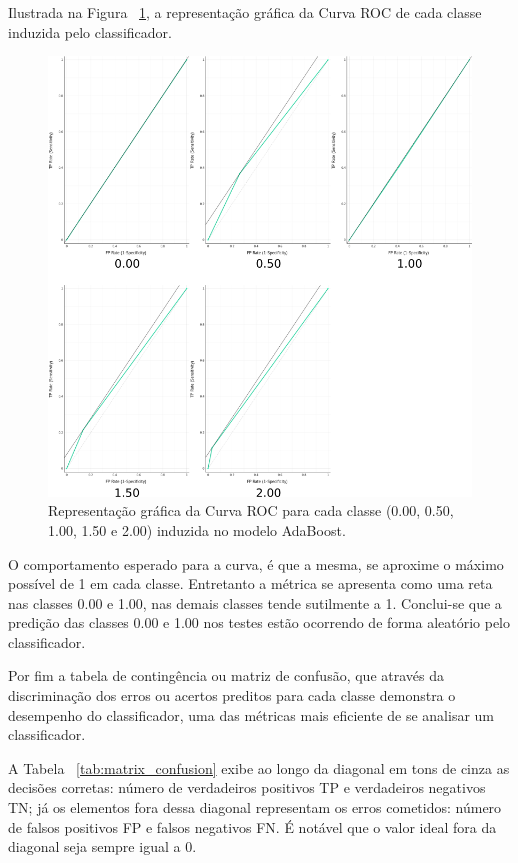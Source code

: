 Ilustrada na Figura ~\ref{fig:roc}, a representação gráfica da Curva ROC de cada classe induzida pelo classificador.

\begin{figure}[H]
\begin{center}
    \includegraphics[scale=0.75]{images/roc.png}
\end{center}
\caption{Representação gráfica da Curva ROC para cada classe (0.00, 0.50, 1.00, 1.50 e 2.00) induzida no modelo AdaBoost.}
\label{fig:roc}
\end{figure}

O comportamento esperado para a curva, é que a mesma, se aproxime o máximo possível de 1 em cada classe. Entretanto a métrica se apresenta como uma reta nas classes 0.00 e 1.00, nas demais classes tende sutilmente a 1. Conclui-se que a predição das classes 0.00 e 1.00 nos testes estão ocorrendo de forma aleatório pelo classificador.

Por fim a tabela de contingência ou matriz de confusão, que através da discriminação dos erros ou acertos preditos para cada classe demonstra o desempenho do classificador, uma das métricas mais eficiente de se analisar um classificador. 

A Tabela ~\ref{tab:matrix_confusion} exibe ao longo da diagonal em tons de cinza as decisões corretas: número de verdadeiros positivos TP e verdadeiros negativos TN; já os elementos fora dessa diagonal representam os erros cometidos: número de falsos positivos FP e falsos negativos FN. É notável que o valor ideal fora da diagonal seja sempre igual a 0.  

